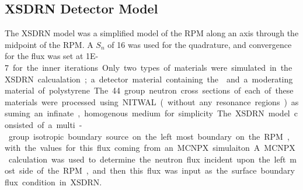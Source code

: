 \subsection{XSDRN Detector Model}
The XSDRN model was a simplified model of the RPM along an axis through the midpoint of the RPM.
A $S_n$ of 16 was used for the quadrature, and convergence for the flux was set at \SI{1E-7} for the inner iterations.
Only two types of materials were simulated in the XSDRN calcualation; a detector material containing the  and a moderating material of polystyrene.
The 44 group neutron cross sections of each of these materials were processed using NITWAL (without any resonance regions) assuming an infinate, homogenous medium for simplicity.
The XSDRN model consisted of a multi-group isotropic boundary source on the left most boundary on the RPM, with the values for this flux coming from an MCNPX simulaiton.
A MCNPX calculation was used to determine the neutron flux incident upon the left most side of the RPM, and then this flux was input as the surface boundary flux condition in XSDRN.

